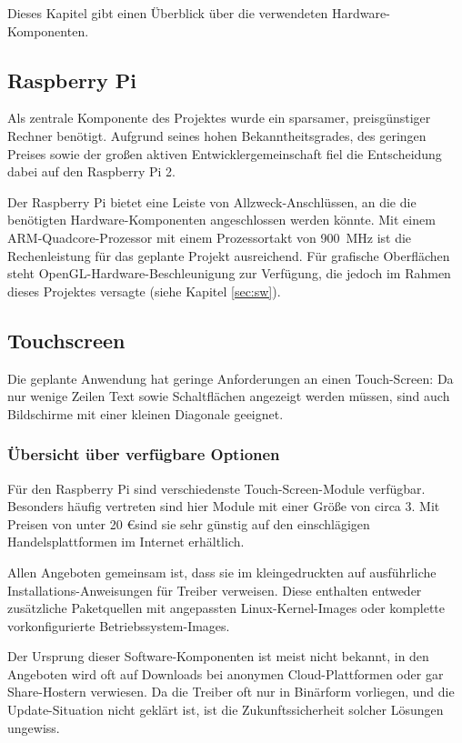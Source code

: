 \documentclass[11pt,a4paper]{IEEEtran}
\begin{document}
Dieses Kapitel gibt einen Überblick über die verwendeten Hardware-Komponenten.

\subsection{Raspberry Pi}

Als zentrale Komponente des Projektes wurde ein sparsamer, preisgünstiger
Rechner benötigt. Aufgrund seines hohen Bekanntheitsgrades, des geringen Preises 
sowie der großen aktiven Entwicklergemeinschaft fiel die Entscheidung dabei
auf den Raspberry Pi 2. 

Der Raspberry Pi bietet eine Leiste von Allzweck-Anschlüssen, an die die
benötigten Hardware-Komponenten angeschlossen werden könnte. Mit einem
ARM-Quadcore-Prozessor mit einem Prozessortakt von \SI{900}{\mega\hertz} ist
die Rechenleistung für das geplante Projekt ausreichend. Für grafische
Oberflächen steht OpenGL-Hardware-Beschleunigung zur Verfügung, die jedoch im 
Rahmen dieses Projektes versagte (siehe Kapitel \ref{sec:sw}).

\subsection{Touchscreen}

Die geplante Anwendung hat geringe Anforderungen an einen Touch-Screen: Da nur
wenige Zeilen Text sowie Schaltflächen angezeigt werden müssen, sind auch
Bildschirme mit einer kleinen Diagonale geeignet.

\subsubsection{Übersicht über verfügbare Optionen}

Für den Raspberry Pi sind verschiedenste Touch-Screen-Module verfügbar.
Besonders häufig vertreten sind hier Module mit einer Größe von circa
\SI{3}{\inch}. Mit Preisen von unter 20 \euro sind sie sehr günstig auf den
einschlägigen Handelsplattformen im Internet erhältlich.

Allen Angeboten gemeinsam ist, dass sie im kleingedruckten auf ausführliche
Installations-Anweisungen für Treiber verweisen. Diese enthalten entweder
zusätzliche Paketquellen mit angepassten Linux-Kernel-Images oder komplette
vorkonfigurierte Betriebssystem-Images. 

Der Ursprung dieser Software-Komponenten ist meist nicht bekannt, in den
Angeboten wird oft auf Downloads bei anonymen Cloud-Plattformen oder gar
Share-Hostern verwiesen. Da die Treiber oft nur in Binärform vorliegen, und die
Update-Situation nicht geklärt ist, ist die Zukunftssicherheit solcher Lösungen
ungewiss.
\end{document}
